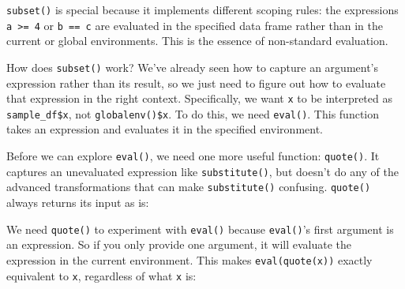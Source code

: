 \texttt{subset()} is special because it implements different scoping
rules: the expressions \texttt{a \textgreater{}= 4} or \texttt{b == c}
are evaluated in the specified data frame rather than in the current or
global environments. This is the essence of non-standard evaluation.

How does \texttt{subset()} work? We've already seen how to capture an
argument's expression rather than its result, so we just need to figure
out how to evaluate that expression in the right context. Specifically,
we want \texttt{x} to be interpreted as \texttt{sample\_df\$x}, not
\texttt{globalenv()\$x}. To do this, we need \texttt{eval()}. This
function takes an expression and evaluates it in the specified
environment. 

Before we can explore \texttt{eval()}, we need one more useful function:
\texttt{quote()}. It captures an unevaluated expression like
\texttt{substitute()}, but doesn't do any of the advanced
transformations that can make \texttt{substitute()} confusing.
\texttt{quote()} always returns its input as is: 

\begin{Shaded}
\begin{Highlighting}[]
\NormalTok{(}\NormalTok{:}\NormalTok{)}
\StringTok{ }\NormalTok{)}
\end{Highlighting}
\end{Shaded}

We need \texttt{quote()} to experiment with \texttt{eval()} because
\texttt{eval()}'s first argument is an expression. So if you only
provide one argument, it will evaluate the expression in the current
environment. This makes \texttt{eval(quote(x))} exactly equivalent to
\texttt{x}, regardless of what \texttt{x} is:

\begin{Shaded}
\begin{Highlighting}[]
\NormalTok{(}\StringTok{ }\NormalTok{))}
\NormalTok{(}

\NormalTok{(}
\end{Highlighting}
\end{Shaded}

